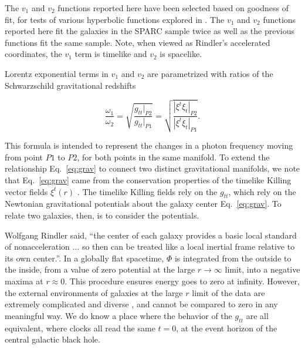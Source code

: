 \documentclass[reprint,%
 amsmath,amssymb,
 aps,
]{revtex4-1}
\begin{document}
 The  $v_1$ and $v_2$ functions reported here have been   selected based on goodness of fit, for tests of various hyperbolic functions  explored in   \cite{Cisneros:2013vha,Cisneros:2014fea,Cisneros2015,Cisn2016}. 
 The  $v_1$ and $v_2$  functions 
 reported here fit the galaxies in the SPARC sample twice as well as the previous functions fit the same sample. 
 Note, when viewed as    Rindler's accelerated coordinates\cite{MTW,Wald, rindler2013essential}, the   $v_1$ term is  timelike   and $v_2$ is spacelike. 
 
 
 
Lorentz exponential terms in  $v_1$ and $v_2$ are parametrized with ratios of  the    Schwarzschild gravitational redshifts

\begin{equation}
       \frac{\omega_1}{\omega_2}  =\sqrt{\frac{g_{tt}|_{P2}}{g_{tt}|_{P1}}} =\sqrt{\frac{|\xi^t\xi_{t}|_{P2}}{|\xi^t\xi_{t}|_{P1}}}.
      \label{eq:grav}
    \end{equation} 
    
    This formula is    intended to represent the changes in a photon frequency moving from point $P1$ to $P2$, for both points in the same manifold. 
To extend the relationship Eq.~\ref{eq:grav} to connect 
  two distinct gravitational manifolds,   we note that Eq.~\ref{eq:grav} came from  the conservation properties of  the timelike  Killing vector fields  
   $\xi^t(r)$  \cite{Wald}.   The timelike Killing fields rely on  the
  $g_{tt}$, 
  which   rely on the Newtonian  gravitational potentials about the galaxy center Eq.~\ref{eq:grav}. 
  To relate two galaxies, then, is to consider the  potentials. 
  
  
   Wolfgang Rindler said,        ``the center of each galaxy provides a basic local standard of nonacceleration ... so then can be treated like a local inertial frame relative to its own center.''\cite{rindler2013essential}.
 In a globally flat spacetime, $\Phi$ is integrated from the outside to the inside, from a value of  zero potential at the large  $r \to \infty$ limit, into a negative maxima at   $r\approx 0$. 
This procedure  ensures   energy goes to zero at infinity.  However, 
  the external environments of galaxies at the large $r$  limit of the data are extremely complicated  and diverse \cite{Pomarede:2020pme,Hoffman:2017ako}, and cannot be compared to zero in any meaningful way.
    We do know a place where the behavior of the $g_{tt}$ are all equivalent, where     clocks all read the same   $t=0$, at the event horizon of the central  galactic black hole. 
 
\end{document}
